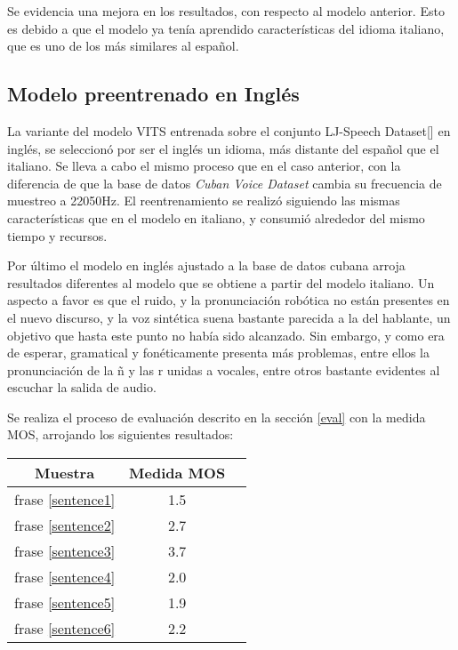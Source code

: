 Se evidencia una mejora en los resultados, con respecto al modelo anterior. Esto es debido a que el modelo ya tenía aprendido características del idioma italiano, que es uno de los más similares al español.


\subsection{Modelo preentrenado en Inglés} 
La variante del modelo VITS entrenada sobre el conjunto LJ-Speech Dataset[\cite{ljspeech}] en inglés, se seleccionó por ser el inglés un idioma, más distante del español que el italiano. Se lleva a cabo el mismo proceso que en el caso anterior, con la diferencia de que la base de datos \textit{Cuban Voice Dataset} cambia su frecuencia de muestreo a 22050Hz. 
El reentrenamiento se realizó siguiendo las mismas características que en el modelo en italiano, y consumió alrededor del mismo tiempo y recursos.

Por último el modelo en inglés ajustado a la base de datos cubana arroja resultados diferentes al modelo que se obtiene a partir del modelo italiano. Un aspecto a favor es que el ruido, y la pronunciación robótica no están presentes en el nuevo discurso, y la voz sintética suena bastante parecida a la del hablante, un objetivo que hasta este punto no había sido alcanzado. Sin embargo, y como era de esperar, gramatical y fonéticamente presenta más problemas, entre ellos la pronunciación de la ñ y las r unidas a vocales, entre otros bastante evidentes al escuchar la salida de audio.

Se realiza el proceso de evaluación descrito en la sección \ref{eval} con la medida MOS, arrojando los siguientes resultados:

\begin{center} \begin{tabular}{ |c|c|c| } 
		\hline 
		Muestra & Medida MOS \\
		\hline
		frase \ref{sentence1} & 1.5 \\
		frase \ref{sentence2} & 2.7 \\
		frase \ref{sentence3} & 3.7 \\
		frase \ref{sentence4} & 2.0 \\
		frase \ref{sentence5} & 1.9 \\
		frase \ref{sentence6} & 2.2 \\
		\hline 
	\end{tabular} 
\end{center}

